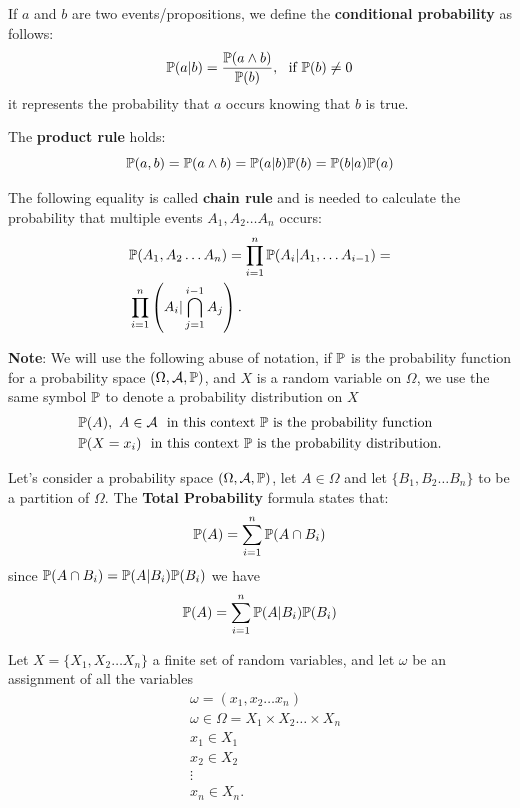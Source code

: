 \documentclass[10pt, letterpaper]{report}
\begin{document}
\bigskip
If $a$ and $b$ are two events/propositions, we define the \textbf{conditional probability} as follows:
\begin{equation}
	\Prob(a|b)=\frac{\Prob(a\land b)}{\Prob(b)}, \ \ \text{if }\Prob(b)\ne0
\end{equation}
it represents the probability that $a$ occurs knowing that $b$ is true.

The \textbf{product rule} holds:
\begin{equation}
	{\mathbb P}(a,b)={\mathbb P}(a\land b)={\mathbb P}(a|b){\mathbb P}(b)={\mathbb P}(b|a){\mathbb P}(a)
\end{equation}

The following equality is called \textbf{chain rule} and is needed to calculate the probability that multiple events $A_1,A_2\dots A_n$ occurs:
\begin{align}
	 & {\mathbb P}(A_1,A_2\dots A_n)=\prod_{i=1}^n{\mathbb P}(A_i|A_1,\dots A_{i-1})=
	\\ &\prod_{i=1}^n\left( A_i|\bigcap_{j=1}^{i-1} A_j \right).
\end{align}

\textbf{Note}: We will use the following abuse of notation, if ${\mathbb P}$ is the probability function for a probability space $(\Omega,\mathcal A,{\mathbb P})$, and $X$ is a random variable on $\Omega$, we use the same symbol ${\mathbb P}$ to denote a probability distribution on $X$
\begin{align}
	 & {\mathbb P}(A), \ A\in\mathcal A \ \ \text{in this context ${\mathbb P}$ is the probability function} \\
	 & {\mathbb P}(X=x_i) \ \ \text{in this context ${\mathbb P}$ is the probability distribution.}
\end{align}

\begin{theorem}
	Let's consider a probability space $(\Omega,\mathcal A, {\mathbb P})$, let $A\in \Omega$ and let $\{B_1,B_2\dots B_n\}$ to be a partition of $\Omega$.
	The \textbf{Total Probability} formula states that:
	\begin{equation}
		{\mathbb P}(A)=\sum_{i=1}^n{\mathbb P}(A\cap B_i)
	\end{equation}
	since ${\mathbb P}(A\cap B_i)={\mathbb P}(A|B_i){\mathbb P}(B_i)$ we have
	\begin{equation}
		{\mathbb P}(A)=\sum_{i=1}^n{\mathbb P}(A|B_i){\mathbb P}(B_i)
	\end{equation}
\end{theorem}

Let $X=\{X_1,X_2\dots X_n\}$ a finite set of random variables, and let $\omega$ be an assignment of all the variables
\begin{align}
	 & \omega=(x_1,x_2\dots x_n)                     \\
	 & \omega\in\Omega=X_1\times X_2\dots \times X_n \\
	 & x_1\in X_1                                    \\
	 & x_2\in X_2                                    \\
	 & \vdots                                        \\
	 & x_n\in X_n.
\end{align}
\end{document}
